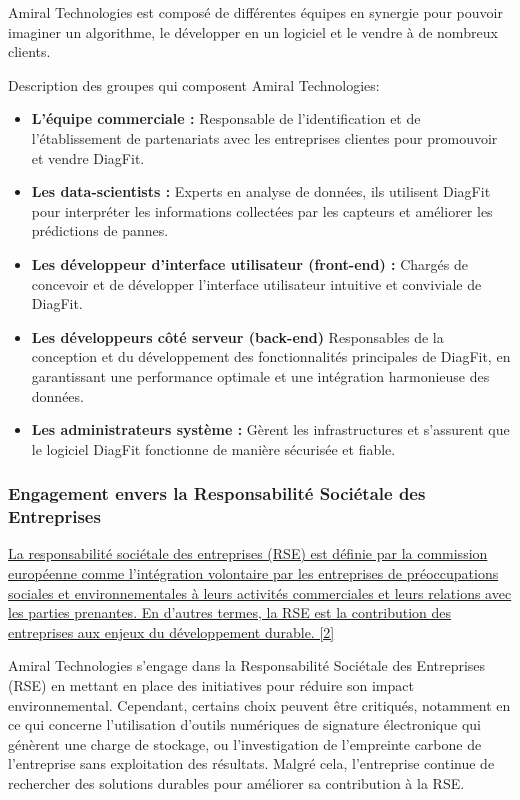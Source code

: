 Amiral Technologies est composé de différentes équipes en synergie pour pouvoir imaginer un algorithme, le développer en un logiciel et le vendre à de nombreux clients.

Description des groupes qui composent Amiral Technologies:
\begin{itemize}
    \item \textbf{L'équipe commerciale :} Responsable de l'identification et de l'établissement de partenariats avec les entreprises clientes pour promouvoir et vendre DiagFit.
    \item \textbf{Les data-scientists :} Experts en analyse de données, ils utilisent DiagFit pour interpréter les informations collectées par les capteurs et améliorer les prédictions de pannes.
    \item \textbf{Les développeur d'interface utilisateur (front-end) :} Chargés de concevoir et de développer l'interface utilisateur intuitive et conviviale de DiagFit.
    \item \textbf{Les développeurs côté serveur (back-end)} Responsables de la conception et du développement des fonctionnalités principales de DiagFit, en garantissant une performance optimale et une intégration harmonieuse des données.
    \item \textbf{Les administrateurs système :} Gèrent les infrastructures et s'assurent que le logiciel DiagFit fonctionne de manière sécurisée et fiable.
\end{itemize}

\subsubsection{Engagement envers la Responsabilité Sociétale des Entreprises}
\hyperref[rse]{La responsabilité sociétale des entreprises (RSE) est définie par la commission européenne comme l'intégration volontaire par les entreprises de préoccupations sociales et environnementales à leurs activités commerciales et leurs relations avec les parties prenantes.
En d'autres termes, la RSE est la contribution des entreprises aux enjeux du développement durable. [2]}

Amiral Technologies s'engage dans la Responsabilité Sociétale des Entreprises (RSE) en mettant en place des initiatives pour réduire son impact environnemental.
Cependant, certains choix peuvent être critiqués, notamment en ce qui concerne l'utilisation d'outils numériques de signature électronique qui génèrent une charge de stockage, ou l'investigation de l'empreinte carbone de l'entreprise sans exploitation des résultats.
Malgré cela, l'entreprise continue de rechercher des solutions durables pour améliorer sa contribution à la RSE.

